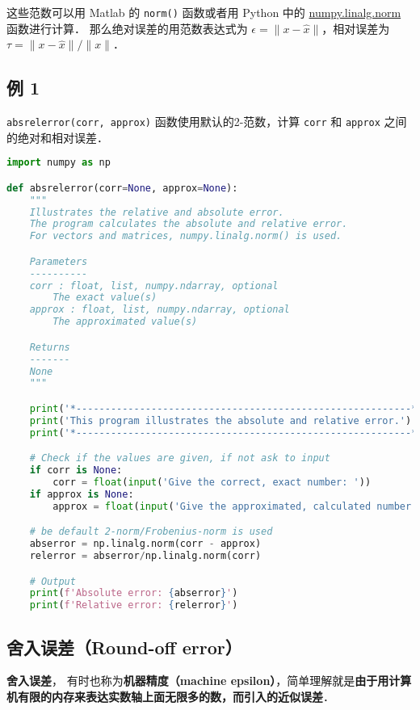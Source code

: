 这些范数可以用 Matlab 的 \verb|norm()| 函数或者用 Python 中的 \href{https://docs.scipy.org/doc/numpy/reference/generated/numpy.linalg.norm.html}{numpy.linalg.norm} 函数进行计算． 那么绝对误差的用范数表达式为 $\epsilon=\|x-\hat{x}\|$，相对误差为  $\tau={\|x-\hat{x}\|}/{\|x\|}$．

\subsection{例 1}
\verb|absrelerror(corr, approx)| 函数使用默认的2-范数，计算 \verb|corr| 和 \verb|approx| 之间的绝对和相对误差．

\begin{lstlisting}[language=python]
import numpy as np

def absrelerror(corr=None, approx=None):
    """ 
    Illustrates the relative and absolute error.
    The program calculates the absolute and relative error. 
    For vectors and matrices, numpy.linalg.norm() is used.

    Parameters
    ----------
    corr : float, list, numpy.ndarray, optional
        The exact value(s)
    approx : float, list, numpy.ndarray, optional
        The approximated value(s)

    Returns
    -------
    None
    """

    print('*----------------------------------------------------------*')
    print('This program illustrates the absolute and relative error.')
    print('*----------------------------------------------------------*')

    # Check if the values are given, if not ask to input
    if corr is None:
        corr = float(input('Give the correct, exact number: '))
    if approx is None:
        approx = float(input('Give the approximated, calculated number: '))

    # be default 2-norm/Frobenius-norm is used
    abserror = np.linalg.norm(corr - approx)
    relerror = abserror/np.linalg.norm(corr)

    # Output
    print(f'Absolute error: {abserror}')
    print(f'Relative error: {relerror}')
\end{lstlisting}

\subsection{舍入误差（Round-off error）}

\textbf{舍入误差}， 有时也称为\textbf{机器精度（machine epsilon）}，简单理解就是\textbf{由于用计算机有限的内存来表达实数轴上面无限多的数，而引入的近似误差}．

